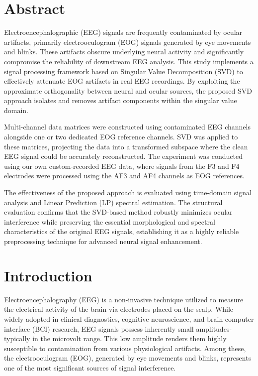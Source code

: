 \documentclass[17pt,a4paper]{extarticle}
\begin{document}
\newpage
\tableofcontents
\newpage
\section{Abstract}
Electroencephalographic (EEG) signals are frequently contaminated by ocular artifacts,
primarily electrooculogram (EOG) signals generated by eye movements and blinks. These
artifacts obscure underlying neural activity and significantly compromise the reliability of
downstream EEG analysis. This study implements a signal processing framework based on
Singular Value Decomposition (SVD) to effectively attenuate EOG artifacts in real EEG
recordings. By exploiting the approximate orthogonality between neural and ocular sources,
the proposed SVD approach isolates and removes artifact components within the singular
value domain.

Multi-channel data matrices were constructed using contaminated EEG channels alongside one
or two dedicated EOG reference channels. SVD was applied to these matrices, projecting the
data into a transformed subspace where the clean EEG signal could be accurately
reconstructed. The experiment was conducted using our own custom-recorded EEG data,
where signals from the F3 and F4 electrodes were processed using the AF3 and AF4 channels
as EOG references.

The effectiveness of the proposed approach is evaluated using time-domain signal analysis
and Linear Prediction (LP) spectral estimation. The structural evaluation confirms that the
SVD-based method robustly minimizes ocular interference while preserving the essential
morphological and spectral characteristics of the original EEG signals, establishing it as a
highly reliable preprocessing technique for advanced neural signal enhancement.

\section{Introduction}

Electroencephalography (EEG) is a non-invasive technique utilized to measure the
electrical activity of the brain via electrodes placed on the scalp. While widely
adopted in clinical diagnostics, cognitive neuroscience, and brain-computer
interface (BCI) research, EEG signals possess inherently small amplitudes-typically
in the microvolt range. This low amplitude renders them highly susceptible to
contamination from various physiological artifacts. Among these, the
electrooculogram (EOG), generated by eye movements and blinks, represents one of
the most significant sources of signal interference.
\end{document}

